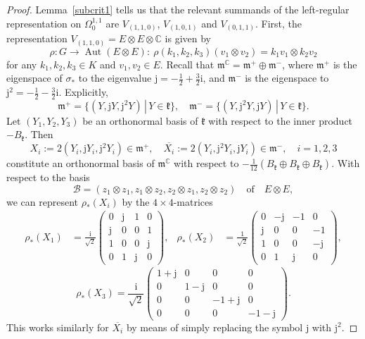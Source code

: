 \documentclass[12pt]{scrartcl}
\theoremstyle{plain}
\theoremstyle{definition}
\newcommand{\C}{\mathbb{C}}%
\newcommand{\Aut}{\operatorname{Aut}}%
\renewcommand{\i}{\mathrm{i}}%
\renewcommand{\j}{\mathrm{j}}%
\newcommand{\m}{\mathfrak{m}}%
\renewcommand{\k}{\mathfrak{k}}%
\begin{document}
\begin{proof}
Lemma~\ref{subcrit1} tells us that the relevant summands of the left-regular representation on $\Omega^{1,1}_0$ are $V_{(1,1,0)}$, $V_{(1,0,1)}$ and $V_{(0,1,1)}$. First, the representation $V_{(1,1,0)}=E\otimes E\otimes\C$ is given by
\[\rho: G\to\Aut(E\otimes E):\ \rho(k_1,k_2,k_3)(v_1\otimes v_2)=k_1v_1\otimes k_2v_2\]
for any $k_1,k_2,k_3\in K$ and $v_1,v_2\in E$. Recall that $\m^\C=\m^+\oplus\m^-$, where $\m^+$ is the eigenspace of $\sigma_\ast$ to the eigenvalue $\j=-\frac{1}{2}+\frac{3}{2}\i$, and $\m^-$ is the eigenspace to $\j^2=-\frac{1}{2}-\frac{3}{2}\i$. Explicitly,
\[\m^+=\{(Y,\j Y,\j^2Y)\,|\,Y\in\k\},\quad\m^-=\{(Y,\j^2Y,\j Y)\,|\,Y\in\k\}.\]
Let $(Y_1,Y_2,Y_3)$ be an orthonormal basis of $\k$ with respect to the inner product $-B_{\k}$. Then
\[X_i:=2(Y_i,\j Y_i,\j^2Y_i)\in\m^+,\quad\overline{X_i}:=2(Y_i,\j^2Y_i,\j Y_i)\in\m^-,\quad i=1,2,3\]
constitute an orthonormal basis of $\m^\C$ with respect to $-\frac{1}{12}(B_\k\oplus B_\k\oplus B_\k)$. With respect to the basis
\[\mathcal{B}=(z_1\otimes z_1,z_1\otimes z_2,z_2\otimes z_1,z_2\otimes z_2)\quad\text{of}\quad E\otimes E,\]
we can represent $\rho_\ast(X_i)$ by the $4\times4$-matrices
\begin{align*}
\rho_\ast(X_1)&=\frac{\i}{\sqrt{2}}\begin{pmatrix}
                               0&\j&1&0\\
                               \j&0&0&1\\
                               1&0&0&\j\\
                               0&1&\j&0
                              \end{pmatrix},&\rho_\ast(X_2)&=\frac{1}{\sqrt{2}}\begin{pmatrix}
                               0&-\j&-1&0\\
                               \j&0&0&-1\\
                               1&0&0&-\j\\
                               0&1&\j&0
                              \end{pmatrix},
\end{align*}
\begin{equation}
\rho_\ast(X_3)=\frac{\i}{\sqrt{2}}\begin{pmatrix}
                               1+\j&0&0&0\\
                               0&1-\j&0&0\\
                               0&0&-1+\j&0\\
                               0&0&0&-1-\j
                              \end{pmatrix}.\label{s3s3action}
\end{equation}
This works similarly for $\overline{X_i}$ by means of simply replacing the symbol $\j$ with $\j^2$. 


\end{proof}
\end{document}
